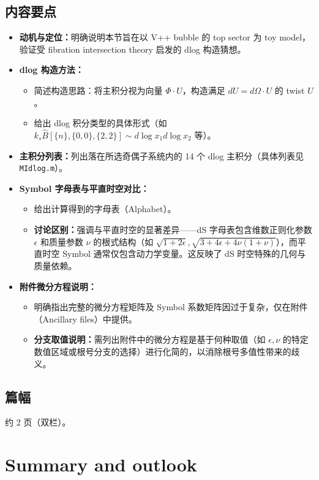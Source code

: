 \documentclass[UTF8,a4paper,11pt]{ctexart}
\begin{document}
\subsection*{内容要点}
\begin{itemize}
  \item \textbf{动机与定位：}明确说明本节旨在以 V++ bubble 的 top sector 为 toy model，验证受 fibration intersection theory 启发的 dlog 构造猜想。
  \item \textbf{dlog 构造方法：}
    \begin{itemize}
        \item 简述构造思路：将主积分视为向量 $\Phi \cdot U$，构造满足 $dU = d\Omega \cdot U$ 的 twist $U$。
        \item 给出 dlog 积分类型的具体形式（如 $k_s \hat{B}[\{n\},\{0,0\},\{2,2\}] \sim d\log x_1 d\log x_2$ 等）。
    \end{itemize}
  \item \textbf{主积分列表：}列出落在所选奇偶子系统内的 14 个 dlog 主积分（具体列表见 \texttt{MIdlog.m}）。
  \item \textbf{Symbol 字母表与平直时空对比：}
    \begin{itemize}
        \item 给出计算得到的字母表（Alphabet）。
        \item \textbf{讨论区别：}强调与平直时空的显著差异——dS 字母表包含维数正则化参数 $\epsilon$ 和质量参数 $\nu$ 的根式结构（如 $\sqrt{1+2\epsilon}, \sqrt{3+4\epsilon+4\nu(1+\nu)}$），而平直时空 Symbol 通常仅包含动力学变量。这反映了 dS 时空特殊的几何与质量依赖。
    \end{itemize}
  \item \textbf{附件微分方程说明：}
    \begin{itemize}
        \item 明确指出完整的微分方程矩阵及 Symbol 系数矩阵因过于复杂，仅在附件（Ancillary files）中提供。
        \item \textbf{分支取值说明：}需列出附件中的微分方程是基于何种取值（如 $\epsilon, \nu$ 的特定数值区域或根号分支的选择）进行化简的，以消除根号多值性带来的歧义。
    \end{itemize}
\end{itemize}
\subsection*{篇幅}
约 2 页（双栏）。

\section{Summary and outlook}
\end{document}
